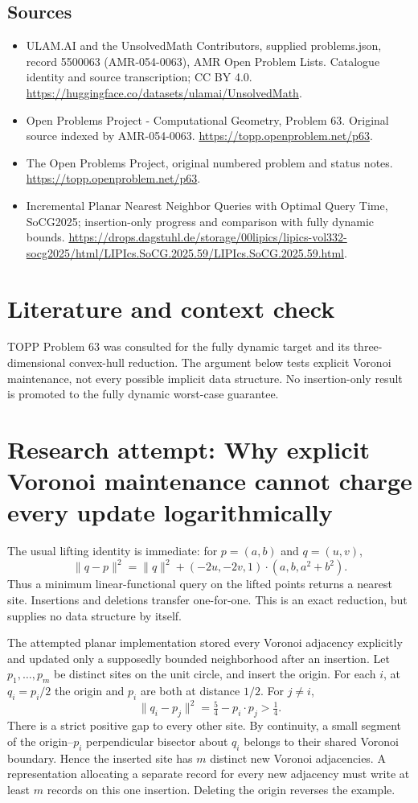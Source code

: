 \documentclass[11pt,a4paper]{article}
\begin{document}
\subsection{Sources}
\begin{itemize}
\item[S1] ULAM.AI and the UnsolvedMath Contributors, supplied problems.json, record 5500063 (AMR-054-0063), AMR Open Problem Lists. Catalogue identity and source transcription; CC BY 4.0.
\url{https://huggingface.co/datasets/ulamai/UnsolvedMath}.
\item[S2] Open Problems Project - Computational Geometry, Problem 63. Original source indexed by AMR-054-0063.
\url{https://topp.openproblem.net/p63}.
\item[S3] The Open Problems Project, original numbered problem and status notes.
\url{https://topp.openproblem.net/p63}.
\item[S4] Incremental Planar Nearest Neighbor Queries with Optimal Query Time, SoCG2025; insertion-only progress and comparison with fully dynamic bounds.
\url{https://drops.dagstuhl.de/storage/00lipics/lipics-vol332-socg2025/html/LIPIcs.SoCG.2025.59/LIPIcs.SoCG.2025.59.html}.
\end{itemize}

\section{Literature and context check}
TOPP Problem 63 was consulted for the fully dynamic target and its
three-dimensional convex-hull reduction. The argument below tests explicit
Voronoi maintenance, not every possible implicit data structure. No insertion-only
result is promoted to the fully dynamic worst-case guarantee.
\section{Research attempt: Why explicit Voronoi maintenance cannot charge every update logarithmically}
The usual lifting identity is immediate: for $p=(a,b)$ and $q=(u,v)$,
\[
 \|q-p\|^2=\|q\|^2+(-2u,-2v,1)\cdot(a,b,a^2+b^2).
\]
Thus a minimum linear-functional query on the lifted points returns a nearest
site. Insertions and deletions transfer one-for-one. This is an exact reduction,
but supplies no data structure by itself.

The attempted planar implementation stored every Voronoi adjacency explicitly
and updated only a supposedly bounded neighborhood after an insertion. Let
$p_1,\ldots,p_m$ be distinct sites on the unit circle, and insert the origin.
For each $i$, at $q_i=p_i/2$ the origin and $p_i$ are both at distance $1/2$.
For $j\ne i$,
\[
 \|q_i-p_j\|^2=\tfrac54-p_i\cdot p_j>\tfrac14.
\]
There is a strict positive gap to every other site. By continuity, a small
segment of the origin--$p_i$ perpendicular bisector about $q_i$ belongs to
their shared Voronoi boundary. Hence the inserted site has $m$ distinct new
Voronoi adjacencies. A representation allocating a separate record for every
new adjacency must write at least $m$ records on this one insertion. Deleting
the origin reverses the example.
\end{document}
